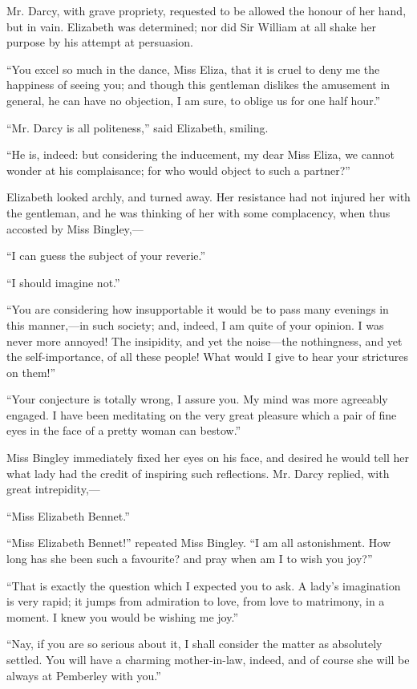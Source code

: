 \documentclass[12pt]{book}
\begin{document}
Mr. Darcy, with grave propriety, requested to be allowed the honour of her hand, but in vain. Elizabeth was determined; nor did Sir William at all shake her purpose by his attempt at persuasion.

``You excel so much in the dance, Miss Eliza, that it is cruel to deny me the happiness of seeing you; and though this gentleman dislikes the amusement in general, he can have no objection, I am sure, to oblige us for one half hour.''

``Mr. Darcy is all politeness,'' said Elizabeth, smiling.

``He is, indeed: but considering the inducement, my dear Miss Eliza, we cannot wonder at his complaisance; for who would object to such a partner?''

Elizabeth looked archly, and turned away. Her resistance had not injured her with the gentleman, and he was thinking of her with some complacency, when thus accosted by Miss Bingley,---

``I can guess the subject of your reverie.''

``I should imagine not.''

``You are considering how insupportable it would be to pass many evenings in this manner,---in such society; and, indeed, I am quite of your opinion. I was never more annoyed! The insipidity, and yet the noise---the nothingness, and yet the self-importance, of all these people! What would I give to hear your strictures on them!''

``Your conjecture is totally wrong, I assure you. My mind was more agreeably engaged. I have been meditating on the very great pleasure which a pair of fine eyes in the face of a pretty woman can bestow.''

Miss Bingley immediately fixed her eyes on his face, and desired he would tell her what lady had the credit of inspiring such reflections. Mr. Darcy replied, with great intrepidity,---

``Miss Elizabeth Bennet.''

``Miss Elizabeth Bennet!'' repeated Miss Bingley. ``I am all astonishment. How long has she been such a favourite? and pray when am I to wish you joy?''

``That is exactly the question which I expected you to ask. A lady's imagination is very rapid; it jumps from admiration to love, from love to matrimony, in a moment. I knew you would be wishing me joy.''

``Nay, if you are so serious about it, I shall consider the matter as absolutely settled. You will have a charming mother-in-law, indeed, and of course she will be always at Pemberley with you.''
\end{document}
